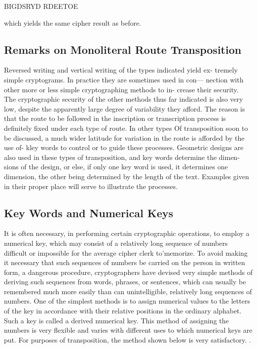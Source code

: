 BIGDSRYD
RDEETOE

which yields the same cipher result as before.

\subsection{Remarks on Monoliteral Route Transposition}

Reversed writing and vertical writing of the types indicated yield ex-
tremely simple cryptograms. In practice they are sometimes used in con—
nection with other more or less simple cryptographing methods to in-
crease their security. The cryptographic security of the other methods
thus far indicated is also very low, despite the apparently large degree of
variability they afford. The reason is that the route to be followed in the
inscription or transcription process is definitely fixed under each type of
route. In other types Of transposition soon to be discussed, a much
wider latitude for variation in the route is afforded by the use of- kley
words to control or to guide these processes. Geometric designs are also
used in these types of transposition, and key words determine the dimen-
sions of the design, or else, if only one key word is used, it determines
one dimension, the other being determined by the length of the text.
Examples given in their proper place will serve to illustrate the processes.

\subsection{Key Words and Numerical Keys}

\mypara It is often necessary, in performing certain cryptographic operations, to employ a numerical key, which may consist of a relatively long
sequence of numbers difficult or impossible for the average cipher clerk
to'memorize. To avoid making it necessary that such sequences of numbers be carried on the person in written form, a dangerous procedure,
cryptographers have devised very simple methods of deriving such
sequences from words, phrases, or sentences, which can usually be remembered much more easily than can unintelligible, relatively long sequences of numbers. One of the simplest methods is to assign numerical
values to the letters of the key in accordance with their relative positions
in the ordinary alphabet. Such a key is called a derived numerical key.
This method of assigning the numbers is very ﬂexible and varies with
different uses to which numerical keys are put. For purposes of transposition, the method shown below is very satisfactory. .

